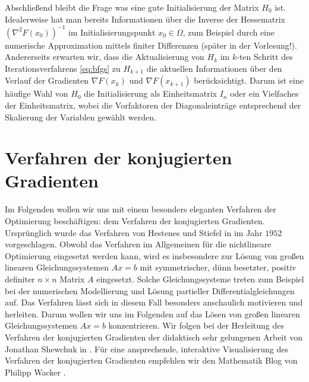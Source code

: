 Abschließend bleibt die Frage was eine gute Initialisierung der Matrix $H_0$ ist.
Idealerweise hat man bereits Informationen über die Inverse der Hessematrix $(\nabla^2 F(x_0))^{-1}$ im Initialisierungspunkt $x_0 \in \Omega$, zum Beispiel durch eine numerische Approximation mittels finiter Differenzen (später in der Vorlesung!).
Andererseits erwarten wir, dass die Aktualisierung von $H_k$ im $k$-ten Schritt des Iterationsverfahrens \eqref{eq:bfgs} zu $H_{k+1}$ die aktuellen Informationen über den Verlauf der Gradienten $\nabla F(x_k)$ und $\nabla F(x_{k+1})$ berücksichtigt.
Darum ist eine häufige Wahl von $H_0$ die Initialisierung als Einheitsmatrix $I_n$ oder ein Vielfaches der Einheitsmatrix, wobei die Vorfaktoren der Diagonaleinträge entsprechend der Skalierung der Variablen gewählt werden.

\section{Verfahren der konjugierten Gradienten}
\label{s:cg_verfahren}
Im Folgenden wollen wir uns mit einem besonders eleganten Verfahren der Optimierung beschäftigen: dem Verfahren der konjugierten Gradienten.
Ursprünglich wurde das Verfahren von Hestenes und Stiefel in \cite{hestenes_1952} im Jahr $1952$ vorgeschlagen.
Obwohl das Verfahren im Allgemeinen für die nichtlineare Optimierung eingesetzt werden kann, wird es insbesondere zur Lösung von großen linearen Gleichungssystemen $Ax = b$ mit symmetrischer, dünn besetzter, positiv definiter $n\times n$ Matrix $A$ eingesetzt.
Solche Gleichungssysteme treten zum Beispiel bei der numerischen Modellierung und Lösung partieller Differentialgleichungen auf.
Das Verfahren lässt sich in diesem Fall besonders anschaulich motivieren und herleiten.
Darum wollen wir uns im Folgenden auf das Lösen von großen linearen Gleichungssystemen $Ax=b$ konzentrieren.
Wir folgen bei der Herleitung des Verfahren der konjugierten Gradienten der didaktisch sehr gelungenen Arbeit von Jonathan Shewchuk in \cite{shewchuk_1994}.
Für eine ansprechende, interaktive Visualisierung des Verfahren der konjugierten Gradienten empfehlen wir den Mathematik Blog von Philipp Wacker \cite{wacker}.

